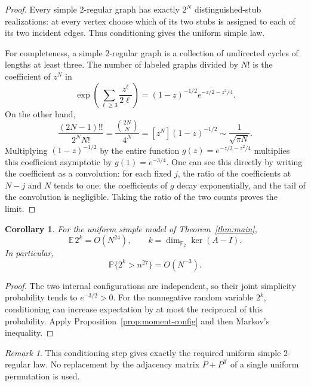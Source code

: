 \documentclass[11pt]{article}
\newtheorem{corollary}[theorem]{Corollary}
\theoremstyle{remark}
\newtheorem{remark}[theorem]{Remark}
\newcommand{\F}{\mathbb F}
\newcommand{\E}{\mathbb E}
\newcommand{\PP}{\mathbb P}
\newcommand{\1}{\mathbf 1}
\begin{document}
\begin{proof}
Every simple $2$-regular graph has exactly $2^N$ distinguished-stub
realizations: at every vertex choose which of its two stubs is assigned
to each of its two incident edges. Thus conditioning gives the uniform
simple law.

For completeness, a simple $2$-regular graph is a collection of
undirected cycles of lengths at least three. The number of labeled
graphs divided by $N!$ is the coefficient of $z^N$ in
\[
 \exp\left(\sum_{\ell\geq3}\frac{z^\ell}{2\ell}\right)
 =(1-z)^{-1/2}e^{-z/2-z^2/4}.
\]
On the other hand,
\[
 \frac{(2N-1)!!}{2^NN!}
 =\frac{\binom{2N}{N}}{4^N}
 =[z^N](1-z)^{-1/2}\sim\frac1{\sqrt{\pi N}}.
\]
Multiplying $(1-z)^{-1/2}$ by the entire function
$g(z)=e^{-z/2-z^2/4}$ multiplies this coefficient asymptotic by
$g(1)=e^{-3/4}$. One can see this directly by writing the coefficient
as a convolution: for each fixed $j$, the ratio of the coefficients
at $N-j$ and $N$ tends to one; the coefficients of $g$ decay
exponentially, and the tail of the convolution is negligible.
Taking the ratio of the two counts proves the limit.
\end{proof}

\begin{corollary}\label{cor:simple-moment}
For the uniform simple model of Theorem~\ref{thm:main},
\begin{equation}\label{eq:simple-moment}
 \E\,2^{k}=O(N^{24}),\qquad
 k=\dim_{\F_2}\ker(A-I).
\end{equation}
In particular,
\begin{equation}\label{eq:cutoff-failure}
 \PP\{2^k>n^{27}\}=O(N^{-3}).
\end{equation}
\end{corollary}

\begin{proof}
The two internal configurations are independent, so their joint
simplicity probability tends to $e^{-3/2}>0$.
For the nonnegative random variable $2^k$, conditioning can increase
expectation by at most the reciprocal of this probability. Apply
Proposition~\ref{prop:moment-config} and then Markov's inequality.
\end{proof}

\begin{remark}
This conditioning step gives exactly the required uniform simple
$2$-regular law. No replacement by the adjacency matrix $P+P^{\mathsf T}$
of a single uniform permutation is used.
\end{remark}
\end{document}
